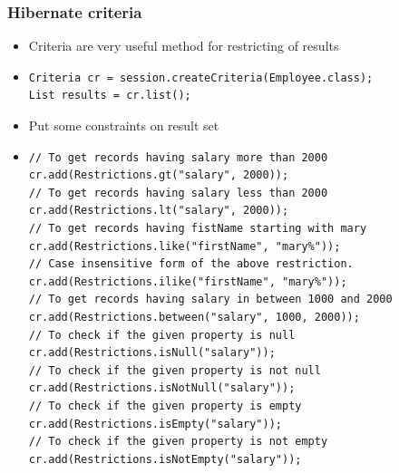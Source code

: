 \documentclass[10pt,xcolor=pdflatex]{beamer}
\begin{document}
\begin{frame}[fragile]\frametitle{Hibernate criteria}
	\begin{itemize}
		\item Criteria are very useful method for restricting of results
		\item[]
        	\footnotesize
            \lstset{language=Java}
            \begin{lstlisting}            
Criteria cr = session.createCriteria(Employee.class);
List results = cr.list();            
			\end{lstlisting}  
            \normalsize
        \medskip
		\item Put some constraints on result set
		\item[]
        	\footnotesize
            \lstset{language=Java}
            \begin{lstlisting}  
// To get records having salary more than 2000
cr.add(Restrictions.gt("salary", 2000));
// To get records having salary less than 2000
cr.add(Restrictions.lt("salary", 2000));
// To get records having fistName starting with mary
cr.add(Restrictions.like("firstName", "mary%"));
// Case insensitive form of the above restriction.
cr.add(Restrictions.ilike("firstName", "mary%"));
// To get records having salary in between 1000 and 2000
cr.add(Restrictions.between("salary", 1000, 2000));
// To check if the given property is null
cr.add(Restrictions.isNull("salary"));
// To check if the given property is not null
cr.add(Restrictions.isNotNull("salary"));
// To check if the given property is empty
cr.add(Restrictions.isEmpty("salary"));
// To check if the given property is not empty
cr.add(Restrictions.isNotEmpty("salary"));            
			\end{lstlisting}  
            \normalsize
	\end{itemize}
\end{frame}
\end{document}
